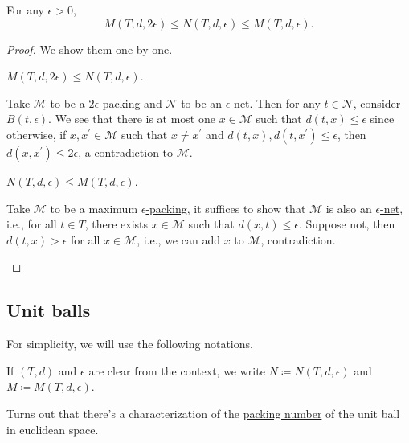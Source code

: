 \begin{lemma}\label{lma:lec10}
	For any \(\epsilon > 0\),
	\[
		M(T, d, 2\epsilon ) \leq N(T, d, \epsilon ) \leq M(T, d, \epsilon ).
	\]
\end{lemma}
\begin{proof}
	We show them one by one.

	\begin{claim}
		\(M(T, d, 2\epsilon ) \leq N(T, d, \epsilon )\).
	\end{claim}
	\begin{explanation}
		Take \(\mathcal{M} \) to be a \hyperref[def:eps-packing]{\(2\epsilon\)-packing} and \(\mathcal{N} \) to be an \hyperref[def:eps-net]{\(\epsilon\)-net}. Then for any \(t\in \mathcal{N} \), consider \(B(t, \epsilon )\). We see that there is at most one \(x\in \mathcal{M} \) such that \(d(t, x) \leq \epsilon \) since otherwise, if \(x, x^{\prime} \in \mathcal{M} \) such that \(x \neq x^{\prime} \) and \(d(t, x), d(t, x^{\prime} ) \leq \epsilon \), then \(d(x, x^{\prime} ) \leq 2\epsilon \), a contradiction to \(\mathcal{M} \).
	\end{explanation}

	\begin{claim}
		\(N(T, d, \epsilon ) \leq M(T, d, \epsilon )\).
	\end{claim}
	\begin{explanation}
		Take \(\mathcal{M} \) to be a maximum \hyperref[def:eps-packing]{\(\epsilon\)-packing}, it suffices to show that \(\mathcal{M} \) is also an \hyperref[def:eps-net]{\(\epsilon\)-net}, i.e., for all \(t\in T\), there exists \(x\in \mathcal{M} \) such that \(d(x, t) \leq \epsilon \). Suppose not, then \(d(t, x) > \epsilon \) for all \(x\in \mathcal{M} \), i.e., we can add \(x\) to \(\mathcal{M} \), contradiction.
	\end{explanation}
\end{proof}

\subsection{Unit balls}
For simplicity, we will use the following notations.

\begin{notation}
	If \((T, d)\) and \(\epsilon \) are clear from the context, we write \(N \coloneqq N(T, d, \epsilon )\) and \(M \coloneqq M(T, d, \epsilon )\).
\end{notation}

Turns out that there's a characterization of the \hyperref[def:packing-number]{packing number} of the unit ball in euclidean space.


